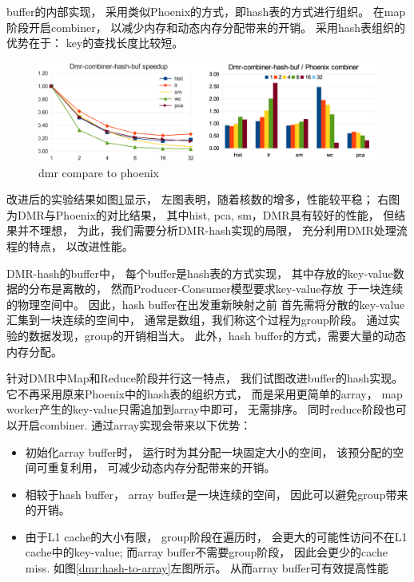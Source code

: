 buffer的内部实现，
采用类似Phoenix的方式，即hash表的方式进行组织。
在map阶段开启combiner，
以减少内存和动态内存分配带来的开销。
采用hash表组织的优势在于：
key的查找长度比较短。

\begin{figure}[!h!t]  
    \centering
    \includegraphics[width=1\textwidth]{img/dmr_time_hash.eps}
    \caption{dmr compare to phoenix}
    \label{dmr:time-hash}
\end{figure}

改进后的实验结果如图\ref{dmr:time-hash}显示，
左图表明，随着核数的增多，性能较平稳；
右图为DMR与Phoenix的对比结果，
其中hist, pca, sm，DMR具有较好的性能，
但结果并不理想，
为此，我们需要分析DMR-hash实现的局限，
充分利用DMR处理流程的特点，
以改进性能。


DMR-hash的buffer中，
每个buffer是hash表的方式实现，
其中存放的key-value数据的分布是离散的，
然而Producer-Consumer模型要求key-value存放
于一块连续的物理空间中。
因此，hash buffer在出发重新映射之前
首先需将分散的key-value汇集到一块连续的空间中，
通常是数组，我们称这个过程为group阶段。
通过实验的数据发现，group的开销相当大。
此外，hash buffer的方式，需要大量的动态内存分配。

针对DMR中Map和Reduce阶段并行这一特点，
我们试图改进buffer的hash实现。
它不再采用原来Phoenix中的hash表的组织方式，
而是采用更简单的array，
map worker产生的key-value只需追加到array中即可，
无需排序。
同时reduce阶段也可以开启combiner.
通过array实现会带来以下优势：

\begin{itemize}
  \item 初始化array buffer时，
  运行时为其分配一块固定大小的空间，
  该预分配的空间可重复利用，
  可减少动态内存分配带来的开销。
  
  \item 相较于hash buffer，
  array buffer是一块连续的空间，
  因此可以避免group带来的开销。
  
  \item 由于L1 cache的大小有限，
  group阶段在遍历时，
  会更大的可能性访问不在L1 cache中的key-value;
而array buffer不需要group阶段，
因此会更少的cache miss.
如图\ref{dmr:hash-to-array}左图所示。
从而array buffer可有效提高性能
\end{itemize}


